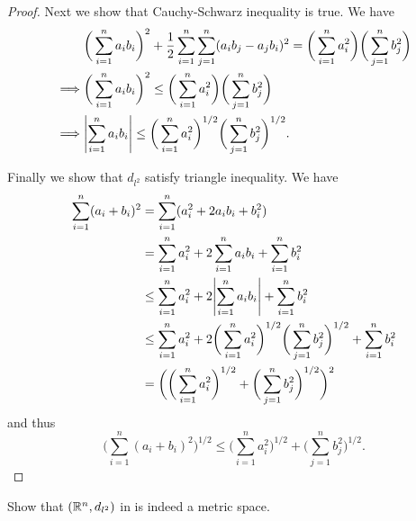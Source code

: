 \begin{proof}
  Next we show that Cauchy-Schwarz inequality is true.
  We have
  \begin{align*}
             & \bigg(\sum_{i = 1}^n a_i b_i\bigg)^2 + \dfrac{1}{2} \sum_{i = 1}^n \sum_{j = 1}^n (a_i b_j - a_j b_i)^2 = \bigg(\sum_{i = 1}^n a_i^2\bigg) \bigg(\sum_{j = 1}^n b_j^2\bigg) \\
    \implies & \bigg(\sum_{i = 1}^n a_i b_i\bigg)^2 \leq \bigg(\sum_{i = 1}^n a_i^2\bigg) \bigg(\sum_{j = 1}^n b_j^2\bigg)                                                                 \\
    \implies & \abs{\sum_{i = 1}^n a_i b_i} \leq \bigg(\sum_{i = 1}^n a_i^2\bigg)^{1 / 2} \bigg(\sum_{j = 1}^n b_j^2\bigg)^{1 / 2}.
  \end{align*}

  Finally we show that \(d_{l^2}\) satisfy triangle inequality.
  We have
  \begin{align*}
    \sum_{i = 1}^n (a_i + b_i)^2 & = \sum_{i = 1}^n (a_i^2 + 2 a_i b_i + b_i^2)                                                                                           \\
                                 & = \sum_{i = 1}^n a_i^2 + 2 \sum_{i = 1}^n a_i b_i + \sum_{i = 1}^n b_i^2                                                               \\
                                 & \leq \sum_{i = 1}^n a_i^2 + 2 \abs{\sum_{i = 1}^n a_i b_i} + \sum_{i = 1}^n b_i^2                                                      \\
                                 & \leq \sum_{i = 1}^n a_i^2 + 2 \bigg(\sum_{i = 1}^n a_i^2\bigg)^{1 / 2} \bigg(\sum_{j = 1}^n b_j^2\bigg)^{1 / 2} + \sum_{i = 1}^n b_i^2 \\
                                 & = \bigg(\bigg(\sum_{i = 1}^n a_i^2\bigg)^{1 / 2} + \bigg(\sum_{j = 1}^n b_j^2\bigg)^{1 / 2}\bigg)^2
  \end{align*}
  and thus
  \[
    \bigg(\sum_{i = 1}^n (a_i + b_i)^2\bigg)^{1 / 2} \leq \bigg(\sum_{i = 1}^n a_i^2\bigg)^{1 / 2} + \bigg(\sum_{j = 1}^n b_j^2\bigg)^{1 / 2}.
  \]
\end{proof}

\begin{ex}\label{ii:ex:1.1.6}
  Show that \((\mathbb{R}^n, d_{l^2})\) in  is indeed a metric space.
\end{ex}

